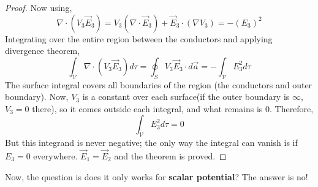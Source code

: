 \documentclass{article}
\begin{document}
\begin{proof}
    Now using,
    \begin{equation*}
        \nabla \cdot (V_3 \vec{E}_3) = V_3 (\nabla \cdot \vec{E}_3) + \vec{E}_3 \cdot (\nabla V_3) = -(E_3)^2
    \end{equation*}
    Integrating over the entire region between the conductors and applying divergence theorem,
    \begin{equation}
        \int_{\mathcal{V}}\nabla\cdot (V_3 \vec{E}_3)d\tau = \oint_S V_3 \vec{E}_3 \cdot d\vec{a} = -\int_\mathcal{V} E_3^2 d\tau
    \end{equation}
    The surface integral covers all boundaries of the region (the conductors and outer boundary). Now, $V_3$ is a constant over each surface(if the outer boundary is $\infty$, $V_3=0$ there), so it comes outside each integral, and what remains is $0$. Therefore,
    \begin{equation*}
        \int_{\mathcal{V}} E_3^2 d\tau = 0
    \end{equation*}
    But this integrand is never negative; the only way the integral can vanish is if $E_3=0$ everywhere. $\vec{E}_1=\vec{E}_2$ and the theorem is proved.
\end{proof}
Now, the question is does it only works for \textbf{scalar potential}? The answer is no!


\end{document}
